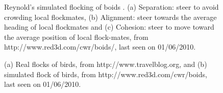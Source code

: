                                                                                                                                                                                                                                                                                                                                                                                                                                                                                                                                                                                                                                                                                                                                                                                                                                                                                                                                                                                                                                                                        \begin{figure}
\centering
{} 
\hspace{0.25cm}
\hspace{0.25cm}
\caption{ Reynold's simulated flocking of boids \protect{}. (a) Separation: steer to avoid crowding local flockmates,  (b) Alignment: steer towards the average heading of local flockmates and (c) Cohesion: steer to move toward the average position of local flock-mates,  from http://www.red3d.com/cwr/boids/, last seen on 01/06/2010.}
\label{fig:boid-rules}
\end{figure}
\begin{figure}
\centering
{} 
\hspace{0.25cm}
\caption{  (a) Real flocks of birds,  from http://www.travelblog.org, and  (b) simulated flock of birds, from http://www.red3d.com/cwr/boids, last seen on 01/06/2010.}
\label{fig:birds-flocking}
\end{figure}
